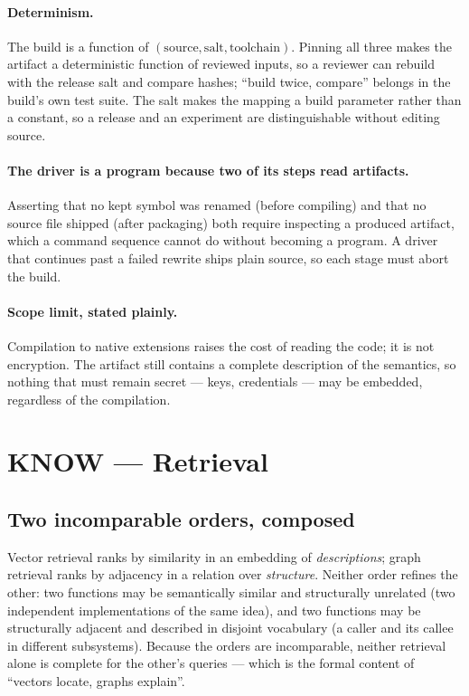 \documentclass[11pt]{article}
\begin{document}
\paragraph{Determinism.} The build is a function of $(\mathrm{source},
\mathrm{salt}, \mathrm{toolchain})$. Pinning all three makes the artifact a
deterministic function of reviewed inputs, so a reviewer can rebuild with the
release salt and compare hashes; ``build twice, compare'' belongs in the build's
own test suite. The salt makes the mapping a build parameter rather than a
constant, so a release and an experiment are distinguishable without editing
source.

\paragraph{The driver is a program because two of its steps read artifacts.}
Asserting that no kept symbol was renamed (before compiling) and that no source
file shipped (after packaging) both require inspecting a produced artifact,
which a command sequence cannot do without becoming a program. A driver that
continues past a failed rewrite ships plain source, so each stage must abort the
build.

\paragraph{Scope limit, stated plainly.} Compilation to native extensions raises
the cost of reading the code; it is not encryption. The artifact still contains
a complete description of the semantics, so nothing that must remain secret ---
keys, credentials --- may be embedded, regardless of the compilation.

\section{KNOW --- Retrieval}

\subsection{Two incomparable orders, composed}
\label{lbl:HS-KNOW-01}

Vector retrieval ranks by similarity in an embedding of \emph{descriptions};
graph retrieval ranks by adjacency in a relation over \emph{structure}. Neither
order refines the other: two functions may be semantically similar and
structurally unrelated (two independent implementations of the same idea), and
two functions may be structurally adjacent and described in disjoint vocabulary
(a caller and its callee in different subsystems). Because the orders are
incomparable, neither retrieval alone is complete for the other's queries ---
which is the formal content of ``vectors locate, graphs explain''.
\end{document}
